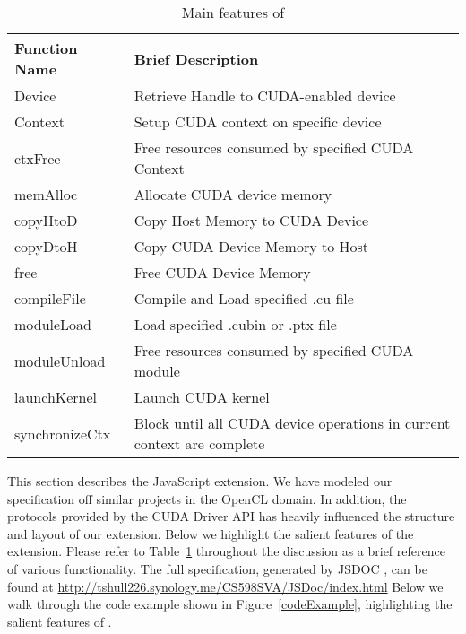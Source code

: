 

\begin{table}
\begin{center}
\begin{tabular}{| l | p{5.5cm} | }
\hline
Function Name & Brief Description \\
\hline
Device & Retrieve Handle to CUDA-enabled device \\
\hline
Context & Setup CUDA context on specific device \\
\hline
ctxFree & Free resources consumed by specified CUDA Context\\
\hline
memAlloc & Allocate CUDA device memory \\
\hline
copyHtoD  & Copy Host Memory to CUDA Device \\
\hline
copyDtoH & Copy CUDA Device Memory to Host \\
\hline
free & Free CUDA Device Memory \\
\hline
compileFile & Compile and Load specified .cu file \\
\hline
moduleLoad & Load specified .cubin or .ptx file \\
\hline
moduleUnload & Free resources consumed by specified CUDA module\\
\hline
launchKernel & Launch CUDA kernel\\
\hline
synchronizeCtx & Block until all CUDA device operations in current context are complete \\
\hline
\end{tabular}
\end{center}
\caption{Main features of \name}
\label{webcudaSpec}
\end{table}

This section describes the \name JavaScript extension. We have modeled our
specification off similar projects \cite{webCL, safariCL, nokiaCL, chromeCL} in the OpenCL
domain.  In addition, the protocols provided by the CUDA Driver API
\cite{cudaAPI} has heavily influenced the structure and layout of our extension.
Below we highlight the salient features of the extension. Please refer to
Table~\ref{webcudaSpec} throughout the discussion as a brief reference of
various \name functionality. The full \name specification, generated by JSDOC
\cite{JSDOC}, can be found at
\url{http://tshull226.synology.me/CS598SVA/JSDoc/index.html}
Below we walk through the code example shown in Figure~\ref{codeExample}, highlighting
the salient features of \namens.


